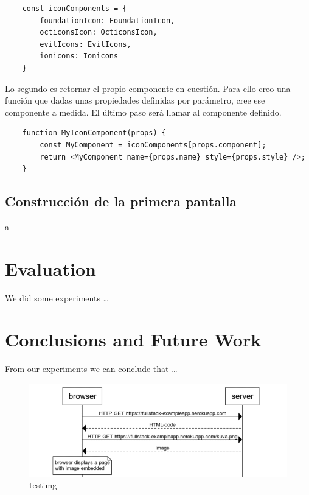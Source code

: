 \documentclass[a4paper, 11pt]{article}
\begin{document}
\begin{lstlisting}
    const iconComponents = {
        foundationIcon: FoundationIcon,
        octiconsIcon: OcticonsIcon,
        evilIcons: EvilIcons,
        ionicons: Ionicons
    }
\end{lstlisting}

Lo segundo es retornar el propio componente en cuestión. Para ello creo una función que dadas unas propiedades definidas 
por parámetro, cree ese componente a medida. El último paso será llamar al componente definido.

\begin{lstlisting}
    function MyIconComponent(props) {
        const MyComponent = iconComponents[props.component];
        return <MyComponent name={props.name} style={props.style} />;
    }
\end{lstlisting}

\subsection{Construcción de la primera pantalla}

a

\pagebreak

\section{Evaluation}

We did some experiments \ldots

\pagebreak

\section{Conclusions and Future Work}

From our experiments we can conclude that \ldots

\begin{figure}[tphb]
    \centering
    \includegraphics[width=7in]{img/testimg.png}
    \caption{testimg}
    \label{img:testimg}
\end{figure}

\pagebreak


\end{document}

